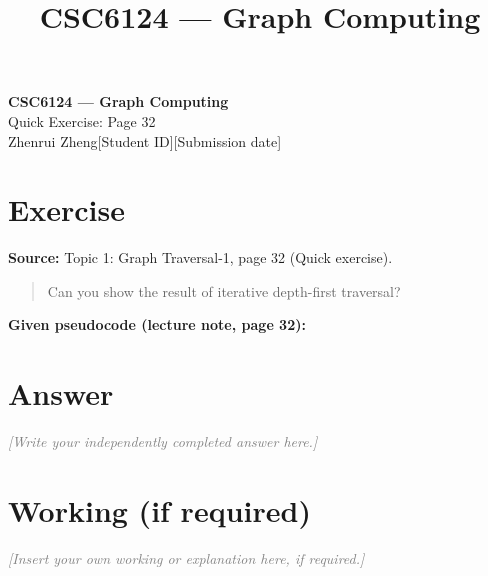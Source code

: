 \documentclass[11pt,a4paper,oneside]{memoir}
\title{\Large\textbf{CSC6124 --- Graph Computing}\\[0.35em]
  \large\ExerciseTitle}
\author{\StudentName\quad\textbar\quad\StudentID}
\date{\SubmissionDate}
\newcommand{\StudentName}{Zhenrui Zheng}
\newcommand{\StudentID}{\textnormal{[Student ID]}}
\newcommand{\SubmissionDate}{\textnormal{[Submission date]}}
\newcommand{\ExerciseTitle}{Quick Exercise: Page 32}
\newcommand{\placeholder}[1]{\textcolor{gray}{\textit{[#1]}}}
\begin{document}
\begin{center}
{\Large\bfseries CSC6124 --- Graph Computing}\\[0.4em]
{\large\ExerciseTitle}\\[0.7em]
\StudentName\quad\textbar\quad\StudentID\quad\textbar\quad\SubmissionDate
\end{center}
\thispagestyle{plain}

\section{Exercise}
\textbf{Source:} Topic 1: Graph Traversal-1, page 32 (Quick exercise).

\begin{quote}
Can you show the result of iterative depth-first traversal?
\end{quote}

\begin{center}

\end{center}

\textbf{Given pseudocode (lecture note, page 32):}


\section{Answer}
\placeholder{Write your independently completed answer here.}

\section{Working (if required)}
\placeholder{Insert your own working or explanation here, if required.}
\end{document}
